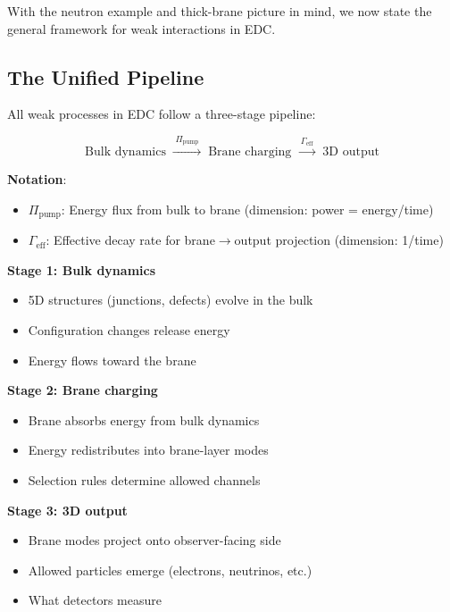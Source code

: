With the neutron example and thick-brane picture in mind, we now state the
general framework for weak interactions in EDC.

\subsection{The Unified Pipeline}

All weak processes in EDC follow a three-stage pipeline:

\begin{equation}
\text{Bulk dynamics} \;\xrightarrow{\;\Pi_{\mathrm{pump}}\;}\;
\text{Brane charging} \;\xrightarrow{\;\Gamma_{\mathrm{eff}}\;}\;
\text{3D output}
\label{eq:unified_pipeline}
\end{equation}

\textbf{Notation}:
\begin{itemize}[nosep]
\item $\Pi_{\mathrm{pump}}$: Energy flux from bulk to brane (dimension: power = energy/time)
\item $\Gamma_{\mathrm{eff}}$: Effective decay rate for brane$\to$output projection (dimension: 1/time)
\end{itemize}

\textbf{Stage 1: Bulk dynamics}
\begin{itemize}[nosep]
\item 5D structures (junctions, defects) evolve in the bulk
\item Configuration changes release energy
\item Energy flows toward the brane
\end{itemize}

\textbf{Stage 2: Brane charging}
\begin{itemize}[nosep]
\item Brane absorbs energy from bulk dynamics
\item Energy redistributes into brane-layer modes
\item Selection rules determine allowed channels
\end{itemize}

\textbf{Stage 3: 3D output}
\begin{itemize}[nosep]
\item Brane modes project onto observer-facing side
\item Allowed particles emerge (electrons, neutrinos, etc.)
\item What detectors measure
\end{itemize}

